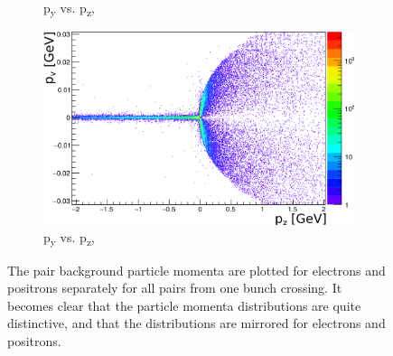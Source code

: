 \begin{figure}
\begin{subfigure}[b]{0.49\textwidth}
        \caption{p\textsubscript{y} vs. p\textsubscript{z}, \Pem}
	\label{fig:py_pz_ele}
    \end{subfigure}
    \begin{subfigure}[b]{0.49\textwidth}
    \centering
        \includegraphics[height=0.21\textheight]{figures/Momentumy_Momentumz_Positrons.png}
        \caption{p\textsubscript{y} vs. p\textsubscript{z}, \Pep}
        \label{fig:py_pz_posi}
    \end{subfigure}
    \caption[Momentum distributions for electrons and positrons]{
    The pair background particle momenta are plotted for electrons and positrons separately for all pairs from one bunch crossing.
    It becomes clear that the particle momenta distributions are quite distinctive, and that the distributions are mirrored for electrons and positrons.
    }
    \label{fig:momenta}
\end{figure}